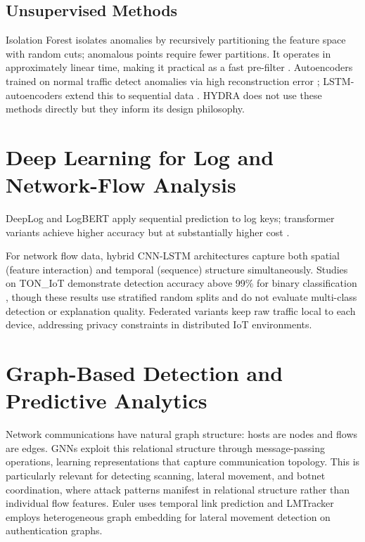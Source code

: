 \documentclass[12pt,a4paper]{report}
\begin{document}
\subsection{Unsupervised Methods}
\label{sec:unsupervised}

Isolation Forest \cite{liu2008} isolates anomalies by recursively partitioning the feature space with random cuts; anomalous points require fewer partitions. It operates in approximately linear time, making it practical as a fast pre-filter \cite{alsaedi2020}. Autoencoders trained on normal traffic detect anomalies via high reconstruction error \cite{moustafa2021}; LSTM-autoencoders extend this to sequential data \cite{malhotra2016}. HYDRA does not use these methods directly but they inform its design philosophy.

\section{Deep Learning for Log and Network-Flow Analysis}
\label{sec:deeplearning}

DeepLog \cite{du2017} and LogBERT \cite{guo2021} apply sequential prediction to log keys; transformer variants achieve higher accuracy but at substantially higher cost \cite{le2022}.

For network flow data, hybrid CNN-LSTM architectures capture both spatial (feature interaction) and temporal (sequence) structure simultaneously. Studies on TON\_IoT demonstrate detection accuracy above 99\% for binary classification \cite{imrana2021}, though these results use stratified random splits and do not evaluate multi-class detection or explanation quality. Federated variants \cite{popoola2021} keep raw traffic local to each device, addressing privacy constraints in distributed IoT environments.

\section{Graph-Based Detection and Predictive Analytics}
\label{sec:graphbased}

Network communications have natural graph structure: hosts are nodes and flows are edges. GNNs exploit this relational structure through message-passing operations, learning representations that capture communication topology. This is particularly relevant for detecting scanning, lateral movement, and botnet coordination, where attack patterns manifest in relational structure rather than individual flow features. Euler \cite{king2023} uses temporal link prediction and LMTracker \cite{fangY2022} employs heterogeneous graph embedding for lateral movement detection on authentication graphs.
\end{document}
